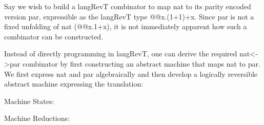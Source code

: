 \documentclass{llncs}
\begin{document}
Say we wish to build a {{langRevT}} combinator to map {{nat}} to its
parity encoded version {{par}}, expressible as the {{langRevT}} type
{{@@x.(1+1)+x}}. Since {{par}} is not a fixed unfolding of {{nat}}
({{@@x.1+x}}), it is not immediately apparent how such a combinator
can be constructed.

Instead of directly programming in {{langRevT}}, one can derive the
required {{nat<->par}} combinator by first constructing an abstract
machine that maps {{nat}} to {{par}}. We first express {{nat}} and
{{par}} algebraically and then develop a logically reversible abstract
machine expressing the translation:











%

\noindent
Machine States:


\noindent
Machine Reductions:
\end{document}
